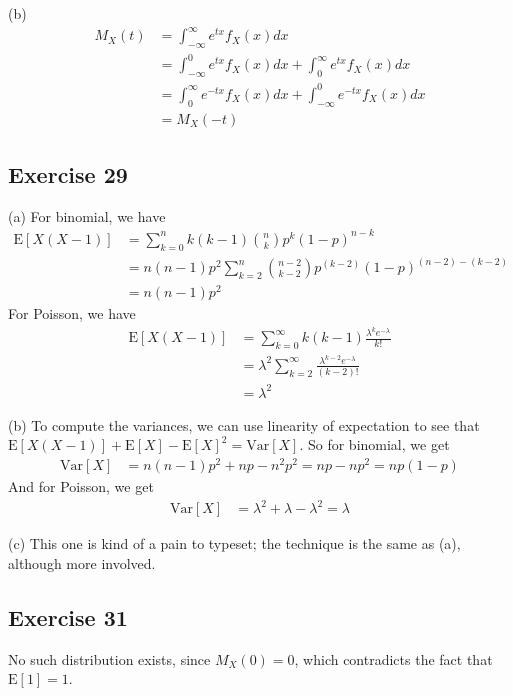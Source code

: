 (b)
\begin{align*}
        M_X(t) &= \int_{-\infty}^{\infty} e^{tx} f_X(x) dx \\ 
               &= \int_{-\infty}^{0} e^{tx} f_X(x) dx + \int_{0}^{\infty} e^{tx} f_X(x) dx \\  
               &= \int_{0}^{\infty} e^{-tx} f_X(x) dx + \int_{-\infty}^{0} e^{-tx} f_X(x) dx \\
               &= M_X(-t)
\end{align*}

\subsection{Exercise 29}
(a) For binomial, we have
\begin{align*}
        \mathrm{E} [X(X - 1)] &= \sum_{k = 0}^n k(k - 1) \binom{n}{k} p^k (1 - p)^{n - k} \\
                              &= n (n - 1) p^2 \sum_{k = 2}^n \binom{n - 2}{k - 2} p^(k - 2) (1 - p)^{(n - 2) - (k - 2)} \\
                              &= n (n - 1) p^2
\end{align*}
For Poisson, we have
\begin{align*}
        \mathrm{E} [X(X - 1)] &= \sum_{k = 0}^{\infty} k(k - 1) \frac{\lambda^k e^{-\lambda}}{k!} \\ 
                              &= \lambda^2 \sum_{k = 2}^{\infty} \frac{\lambda^{k - 2} e^{-\lambda}}{(k - 2)!} \\
                              &= \lambda^2
\end{align*}

(b) To compute the variances, we can use linearity of expectation to see that 
$\mathrm{E} [X(X - 1)] + \mathrm{E} [X] - \mathrm{E} [X]^2 = \mathrm{Var} [X]$. So for binomial, we get
\begin{align*}
        \mathrm{Var} [X] &= n (n - 1) p^2 + np - n^2 p^2 = np - np^2 = np(1 - p)
\end{align*}
And for Poisson, we get
\begin{align*}
        \mathrm{Var} [X] &= \lambda^2 + \lambda - \lambda^2 = \lambda 
\end{align*}

(c) This one is kind of a pain to typeset; the technique is the same as (a), although more involved.

\subsection{Exercise 31}
No such distribution exists, since $M_X(0) = 0$, which contradicts the fact that $\mathrm{E} [1] = 1$.
